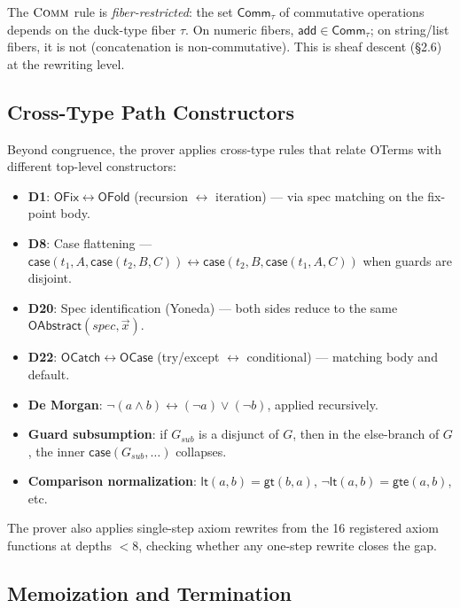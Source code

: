 The $\textsc{Comm}$ rule is \emph{fiber-restricted}: the set
$\mathsf{Comm}_\tau$ of commutative operations depends on the duck-type
fiber $\tau$.  On numeric fibers, $\mathsf{add} \in \mathsf{Comm}_\tau$;
on string/list fibers, it is not (concatenation is non-commutative).
This is sheaf descent (\S2.6) at the rewriting level.

\subsection{Cross-Type Path Constructors}

Beyond congruence, the prover applies cross-type rules that relate
OTerms with different top-level constructors:

\begin{itemize}
  \item \textbf{D1}: $\mathsf{OFix} \leftrightarrow \mathsf{OFold}$
    (recursion $\leftrightarrow$ iteration) --- via spec matching
    on the fix-point body.
  \item \textbf{D8}: Case flattening ---
    $\mathsf{case}(t_1, A, \mathsf{case}(t_2, B, C))
    \leftrightarrow \mathsf{case}(t_2, B, \mathsf{case}(t_1, A, C))$
    when guards are disjoint.
  \item \textbf{D20}: Spec identification (Yoneda) --- both sides
    reduce to the same $\mathsf{OAbstract}(\mathit{spec}, \vec{x})$.
  \item \textbf{D22}: $\mathsf{OCatch} \leftrightarrow \mathsf{OCase}$
    (try/except $\leftrightarrow$ conditional) --- matching body and
    default.
  \item \textbf{De Morgan}:
    $\lnot(a \land b) \leftrightarrow (\lnot a) \lor (\lnot b)$,
    applied recursively.
  \item \textbf{Guard subsumption}:
    if $G_{\mathit{sub}}$ is a disjunct of $G$, then in the
    else-branch of $G$, the inner
    $\mathsf{case}(G_{\mathit{sub}}, \ldots)$ collapses.
  \item \textbf{Comparison normalization}:
    $\mathsf{lt}(a,b) = \mathsf{gt}(b,a)$,
    $\lnot\mathsf{lt}(a,b) = \mathsf{gte}(a,b)$, etc.
\end{itemize}

The prover also applies single-step axiom rewrites from the
16 registered axiom functions at depths $< 8$, checking whether
any one-step rewrite closes the gap.

\subsection{Memoization and Termination}

